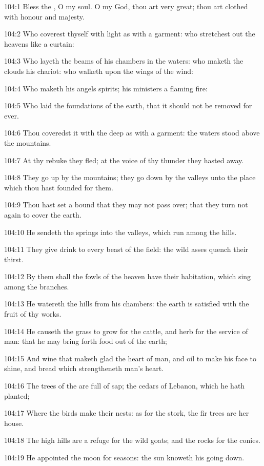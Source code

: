 104:1 Bless the \LORD, O my soul. O \LORD my God, thou art very great; thou art clothed with honour and majesty.

104:2 Who coverest thyself with light as with a garment: who stretchest out the heavens like a curtain:

104:3 Who layeth the beams of his chambers in the waters: who maketh the clouds his chariot: who walketh upon the wings of the wind:

104:4 Who maketh his angels spirits; his ministers a flaming fire:

104:5 Who laid the foundations of the earth, that it should not be removed for ever.

104:6 Thou coveredst it with the deep as with a garment: the waters stood above the mountains.

104:7 At thy rebuke they fled; at the voice of thy thunder they hasted away.

104:8 They go up by the mountains; they go down by the valleys unto the place which thou hast founded for them.

104:9 Thou hast set a bound that they may not pass over; that they turn not again to cover the earth.

104:10 He sendeth the springs into the valleys, which run among the hills.

104:11 They give drink to every beast of the field: the wild asses quench their thirst.

104:12 By them shall the fowls of the heaven have their habitation, which sing among the branches.

104:13 He watereth the hills from his chambers: the earth is satisfied with the fruit of thy works.

104:14 He causeth the grass to grow for the cattle, and herb for the service of man: that he may bring forth food out of the earth;

104:15 And wine that maketh glad the heart of man, and oil to make his face to shine, and bread which strengtheneth man's heart.

104:16 The trees of the \LORD are full of sap; the cedars of Lebanon, which he hath planted;

104:17 Where the birds make their nests: as for the stork, the fir trees are her house.

104:18 The high hills are a refuge for the wild goats; and the rocks for the conies.

104:19 He appointed the moon for seasons: the sun knoweth his going down.

